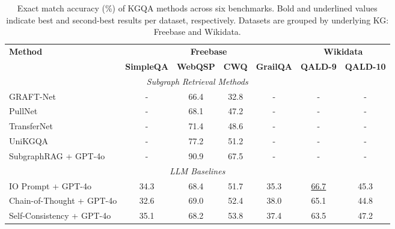 \documentclass[sigconf]{acmart}
\begin{document}
\begin{table}[t]
\centering
\caption{Exact match accuracy (\%) of KGQA methods across six benchmarks. Bold and underlined values indicate best and second-best results per dataset, respectively. Datasets are grouped by underlying KG: Freebase and Wikidata.}
\label{tab:results}
\begin{tabular}{lcccccc}
\toprule
\multirow{2}{*}{\textbf{Method}} & \multicolumn{4}{c}{\textbf{Freebase}} & \multicolumn{2}{c}{\textbf{Wikidata}} \\
\cmidrule(lr){2-5} \cmidrule(lr){6-7}
 & \textbf{SimpleQA} & \textbf{WebQSP} & \textbf{CWQ} & \textbf{GrailQA} & \textbf{QALD-9} & \textbf{QALD-10} \\
\midrule
\multicolumn{7}{c}{\textit{Subgraph Retrieval Methods}} \\
\midrule
GRAFT-Net \citep{sun2018open} & - & 66.4 & 32.8 & - & - & - \\
PullNet \citep{sun2019pullnet} & - & 68.1 & 47.2 & - & - & - \\
TransferNet \citep{shi2021transfernet} & - & 71.4 & 48.6 & - & - & - \\
UniKGQA \citep{jiang2022unikgqa} & - & 77.2 & 51.2 & - & - & - \\
SubgraphRAG + GPT-4o \citep{li2024simple} & - & 90.9 & 67.5 & - & - & - \\
\midrule
\multicolumn{7}{c}{\textit{LLM Baselines}} \\
\midrule
IO Prompt + GPT-4o & 34.3 & 68.4 & 51.7 & 35.3 & \underline{66.7} & 45.3 \\
Chain-of-Thought + GPT-4o & 32.6 & 69.0 & 52.4 & 38.0 & 65.1 & 44.8 \\
Self-Consistency + GPT-4o & 35.1 & 68.2 & 53.8 & 37.4 & 63.5 & 47.2 \\
\midrule

\end{tabular}
\end{table}
\end{document}
